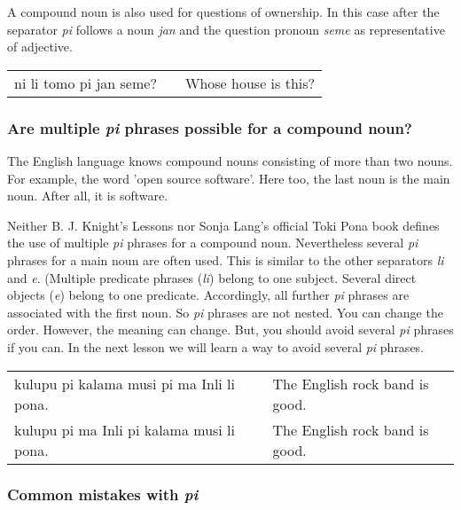 A compound noun is also used for questions of ownership.
In this case after the separator \textit{pi} follows a noun \textit{jan} and the question pronoun \textit{seme} as representative of adjective.

\begin{supertabular}{p{5,5cm}|ll}
    ni li tomo pi jan seme? &  & Whose house is this? \\
\end{supertabular}

%
\subsubsection*{Are multiple \textit{pi} phrases possible for a compound noun?}
%

The English language knows compound nouns consisting of more than two nouns.
For example, the word 'open source software'.
Here too, the last noun is the main noun.
After all, it is software.

Neither B. J. Knight's Lessons nor Sonja Lang's official Toki Pona book defines the use of multiple \textit{pi} phrases for a compound noun.
Nevertheless several \textit{pi} phrases for a main noun are often used.
This is similar to the other separators \textit{li} and \textit{e}.
(Multiple predicate phrases (\textit{li}) belong to one subject.
Several direct objects (\textit{e}) belong to one predicate.
Accordingly, all further \textit{pi} phrases are associated with the first noun.
So \textit{pi} phrases are not nested.
You can change the order.
However, the meaning can change.
But, you should avoid several \textit{pi} phrases if you can.
In the next lesson we will learn a way to avoid several \textit{pi} phrases.

\begin{supertabular}{p{5,5cm}|ll}
    kulupu pi kalama musi pi ma Inli li pona. &  & The English rock band is good. \\
    kulupu pi ma Inli pi kalama musi li pona. &  & The English rock band is good. \\
\end{supertabular}

%
\subsubsection*{Common mistakes with \textit{pi}}
\label{'mistakes_with_pi'}
%

